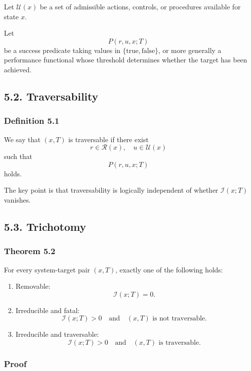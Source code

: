 \documentclass[
]{article}
\begin{document}
Let \(\mathcal{U}(x)\) be a set of admissible actions, controls, or
procedures available for state \(x\).

Let \[
P(r,u,x;T)
\] be a success predicate taking values in
\(\{\text{true},\text{false}\}\), or more generally a performance
functional whose threshold determines whether the target has been
achieved.

\subsection{5.2. Traversability}\label{traversability}

\subsubsection{Definition 5.1}\label{definition-5.1}

We say that \((x,T)\) is traversable if there exist \[
r \in \mathcal{R}(x), \quad u \in \mathcal{U}(x)
\] such that \[
P(r,u,x;T)
\] holds.

The key point is that traversability is logically independent of whether
\(\mathcal{I}(x;T)\) vanishes.

\subsection{5.3. Trichotomy}\label{trichotomy}

\subsubsection{Theorem 5.2}\label{theorem-5.2}

For every system-target pair \((x,T)\), exactly one of the following
holds:

\begin{enumerate}
\def\labelenumi{\arabic{enumi}.}
\item
  Removable: \[
  \mathcal{I}(x;T)=0.
  \]
\item
  Irreducible and fatal: \[
  \mathcal{I}(x;T)>0
  \quad\text{and}\quad
  (x,T)\text{ is not traversable.}
  \]
\item
  Irreducible and traversable: \[
  \mathcal{I}(x;T)>0
  \quad\text{and}\quad
  (x,T)\text{ is traversable.}
  \]
\end{enumerate}

\subsubsection{Proof}\label{proof-4}
\end{document}
